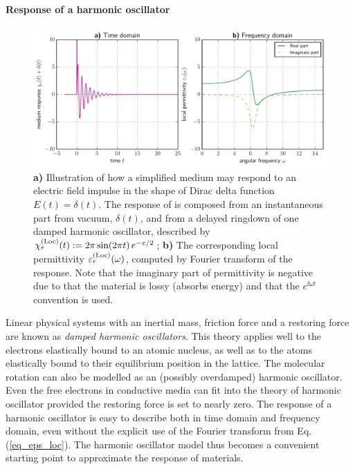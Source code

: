 \paragraph{Response of a harmonic oscillator} \label{chap_lorentzmedia} %
\begin{figure}[t] \caption{\textbf{a)} Illustration of how a simplified medium may respond to an electric field impulse in the shape of Dirac delta function  $E(t) = \delta(t)$. The response of  is composed from an instantaneous part from vacuum, $\delta(t)$, and from a delayed ringdown of one damped harmonic oscillator, described by $\chi_e^{\rm(Loc)}(t) := 2\pi \sin(2\pi t)\,e^{-x/2}$; \textbf{b)} The corresponding local permittivity $\varepsilon^{\rm(Loc)}_r(\omega)$, computed by Fourier transform of the response. Note that the imaginary part of permittivity is negative due to that the material is lossy (absorbs energy) and that the $e^{\ii\omega t}$ convention is used.} \label{fg_oscillator_spectrum} \centering 
	\includegraphics[width=15cm]{img/oscillator_spectrum.pdf}
\end{figure}
Linear physical systems with an inertial mass, friction force and a restoring force are known as \textit{damped harmonic oscillators}. 
This theory applies well to the electrons elastically bound to an atomic nucleus, as well as to the atoms elastically bound to their equilibrium position in the lattice. The molecular rotation can also be modelled as an (possibly overdamped) harmonic oscillator. Even the free electrons in conductive media can fit into the theory of harmonic oscillator provided the restoring force is set to nearly zero. The response of a harmonic oscillator is easy to describe both in time domain and frequency domain, even without the explicit use of the Fourier transform from Eq. (\ref{eq_eps_loc}). The harmonic oscillator model thus becomes a convenient starting point to approximate the response of materials.

